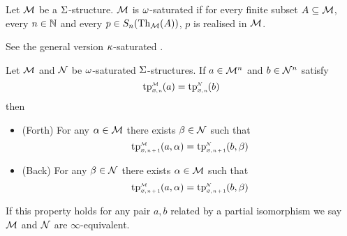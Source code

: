\begin{dfn}[$\om$-saturation]
    Let $\mathcal{M}$ be a $\Sigma$-structure. 
    $\mathcal{M}$ is $\om$-saturated if for every finite subset $A \subseteq \mathcal{M}$, 
    every $n \in \mathbb{N}$ and every $p \in S_n(\mathrm{Th}_{\mathcal{M}}(A))$,
    $p$ is realised in $\mathcal{M}$.

    See the general version $\kappa$-saturated .
\end{dfn}

\begin{prop}
    Let $\mathcal{M}$ and $\mathcal{N}$ be $\om$-saturated $\Sigma$-structures.
    If $a \in \mathcal{M}^n$ and $b \in \mathcal{N}^n$ satisfy
    \[\subintp{\nothing,n}{\MM}{\tp}(a) = 
    \subintp{\nothing,n}{\NN}{\tp}(b)\]
    then 
    \begin{itemize}
        \item (Forth) For any $\alpha \in \mathcal{M}$ there exists $\beta \in \mathcal{N}$ such that
        \[\subintp{\nothing,n+1}{\MM}{\tp}(a,\al) = 
        \subintp{\nothing,n+1}{\NN}{\tp}(b,\be)\]
        \item (Back) For any $\beta \in \mathcal{N}$ there exists $\alpha \in \mathcal{M}$ such that
        \[\subintp{\nothing,n+1}{\MM}{\tp}(a,\al) = 
        \subintp{\nothing,n+1}{\NN}{\tp}(b,\be)\]
    \end{itemize}
    If this property holds for any pair $a,b$ related by a partial isomorphism
    we say $\mathcal{M}$ and $\mathcal{N}$ are $\infty$-equivalent.
\end{prop}
